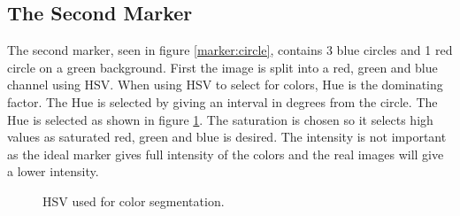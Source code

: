 \subsection{The Second Marker}
The second marker, seen in figure \ref{marker:circle}, contains 3 blue circles and 1 red circle on a green background.
First the image is split into a red, green and blue channel using HSV.
When using HSV to select for colors, Hue is the dominating factor.
The Hue is selected by giving an interval in degrees from the circle.
The Hue is selected as shown in figure \ref{fig:hsv_color_segmentation}.
The saturation is chosen so it selects high values as saturated red, green and blue is desired.
The intensity is not important as the ideal marker gives full intensity of the colors and the real images will give a lower intensity.

\begin{figure}
\caption{HSV used for color segmentation.}
\label{fig:hsv_color_segmentation}
\end{figure}

